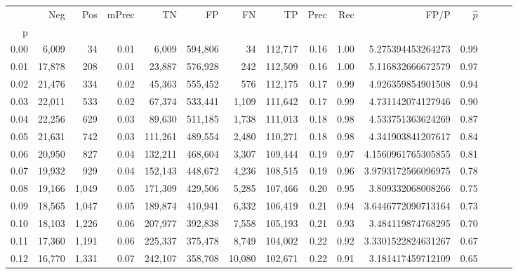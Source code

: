 \begin{tabular}{rrrrrrrrrrrrrrr}
\toprule
{} &     Neg &    Pos & mPrec &       TN &       FP &       FN &       TP &  Prec &   Rec &                   FP/P & $\hat{p}$ \\
p    &         &        &       &          &          &          &          &       &       &                        &           \\
\midrule
0.00 &   6,009 &     34 &  0.01 &    6,009 &  594,806 &       34 &  112,717 &  0.16 &  1.00 &      5.275394453264273 &      0.99 \\
0.01 &  17,878 &    208 &  0.01 &   23,887 &  576,928 &      242 &  112,509 &  0.16 &  1.00 &      5.116832666672579 &      0.97 \\
0.02 &  21,476 &    334 &  0.02 &   45,363 &  555,452 &      576 &  112,175 &  0.17 &  0.99 &      4.926359854901508 &      0.94 \\
0.03 &  22,011 &    533 &  0.02 &   67,374 &  533,441 &    1,109 &  111,642 &  0.17 &  0.99 &      4.731142074127946 &      0.90 \\
0.04 &  22,256 &    629 &  0.03 &   89,630 &  511,185 &    1,738 &  111,013 &  0.18 &  0.98 &      4.533751363624269 &      0.87 \\
0.05 &  21,631 &    742 &  0.03 &  111,261 &  489,554 &    2,480 &  110,271 &  0.18 &  0.98 &      4.341903841207617 &      0.84 \\
0.06 &  20,950 &    827 &  0.04 &  132,211 &  468,604 &    3,307 &  109,444 &  0.19 &  0.97 &     4.1560961765305855 &      0.81 \\
0.07 &  19,932 &    929 &  0.04 &  152,143 &  448,672 &    4,236 &  108,515 &  0.19 &  0.96 &     3.9793172566096975 &      0.78 \\
0.08 &  19,166 &  1,049 &  0.05 &  171,309 &  429,506 &    5,285 &  107,466 &  0.20 &  0.95 &      3.809332068008266 &      0.75 \\
0.09 &  18,565 &  1,047 &  0.05 &  189,874 &  410,941 &    6,332 &  106,419 &  0.21 &  0.94 &     3.6446772090713164 &      0.73 \\
0.10 &  18,103 &  1,226 &  0.06 &  207,977 &  392,838 &    7,558 &  105,193 &  0.21 &  0.93 &      3.484119874768295 &      0.70 \\
0.11 &  17,360 &  1,191 &  0.06 &  225,337 &  375,478 &    8,749 &  104,002 &  0.22 &  0.92 &     3.3301522824631267 &      0.67 \\
0.12 &  16,770 &  1,331 &  0.07 &  242,107 &  358,708 &   10,080 &  102,671 &  0.22 &  0.91 &      3.181417459712109 &      0.65 \\

\end{tabular}
